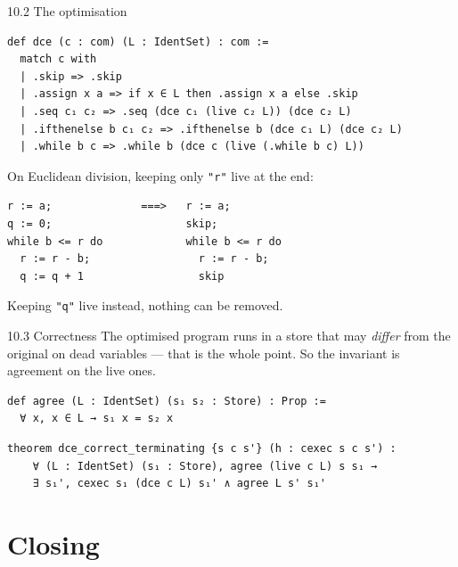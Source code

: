 \documentclass[aspectratio=169,10pt]{beamer}
\newcommand{\code}[1]{\texttt{\small #1}}
\begin{document}
\begin{frame}[fragile]{10.2 The optimisation}
\begin{lstlisting}
def dce (c : com) (L : IdentSet) : com :=
  match c with
  | .skip => .skip
  | .assign x a => if x ∈ L then .assign x a else .skip
  | .seq c₁ c₂ => .seq (dce c₁ (live c₂ L)) (dce c₂ L)
  | .ifthenelse b c₁ c₂ => .ifthenelse b (dce c₁ L) (dce c₂ L)
  | .while b c => .while b (dce c (live (.while b c) L))
\end{lstlisting}
On Euclidean division, keeping only \code{"r"} live at the end:
\begin{lstlisting}
r := a;              ===>   r := a;
q := 0;                     skip;
while b <= r do             while b <= r do
  r := r - b;                 r := r - b;
  q := q + 1                  skip
\end{lstlisting}
Keeping \code{"q"} live instead, nothing can be removed.
\end{frame}

\begin{frame}[fragile]{10.3 Correctness}
The optimised program runs in a store that may \emph{differ} from the
original on dead variables --- that is the whole point.  So the invariant is
agreement on the live ones.
\begin{lstlisting}
def agree (L : IdentSet) (s₁ s₂ : Store) : Prop :=
  ∀ x, x ∈ L → s₁ x = s₂ x
\end{lstlisting}
\begin{center}
\end{center}
\begin{lstlisting}
theorem dce_correct_terminating {s c s'} (h : cexec s c s') :
    ∀ (L : IdentSet) (s₁ : Store), agree (live c L) s s₁ →
    ∃ s₁', cexec s₁ (dce c L) s₁' ∧ agree L s' s₁'
\end{lstlisting}
\end{frame}

\section{Closing}
\end{document}
